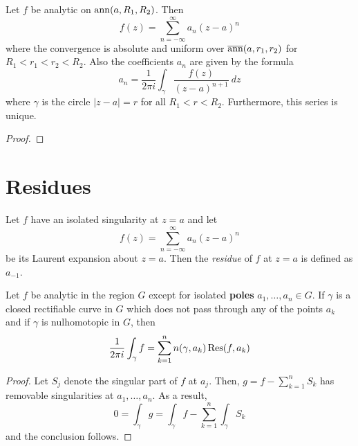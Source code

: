 \begin{theorem}
    Let $f$ be analytic on $\operatorname{ann}(a,R_1,R_2)$. Then 
    \begin{equation*}
        f(z) = \sum_{n = -\infty}^\infty a_n(z - a)^n
    \end{equation*}
    where the convergence is absolute and uniform over $\overline{\operatorname{ann}}(a,r_1,r_2)$ for $R_1 < r_1 < r_2 < R_2$. Also the coefficients $a_n$ are given by the formula 
    \begin{equation*}
        a_n = \frac{1}{2\pi i}\int_\gamma\frac{f(z)}{(z - a)^{n + 1}}~dz
    \end{equation*}
    where $\gamma$ is the circle $|z - a| = r$ for all $R_1 < r < R_2$. Furthermore, this series is unique.
\end{theorem}
\begin{proof}
    
\end{proof}

\section{Residues}

\begin{definition}
    Let $f$ have an isolated singularity at $z = a$ and let 
    \begin{equation*}
        f(z) = \sum_{n = -\infty}^\infty a_n(z - a)^n
    \end{equation*}
    be its Laurent expansion about $z = a$. Then the \textit{residue} of $f$ at $z = a$ is defined as $a_{-1}$.
\end{definition}

\begin{theorem}
    Let $f$ be analytic in the region $G$ except for isolated \textbf{poles} $a_1,\ldots,a_n\in G$. If $\gamma$ is a closed rectifiable curve in $G$ which does not pass through any of the points $a_k$ and if $\gamma$ is nulhomotopic in $G$, then 
    \begin{equation*}
        \frac{1}{2\pi i}\int_\gamma f = \sum_{k = 1}^n n(\gamma,a_k)\operatorname{Res}(f,a_k)
    \end{equation*}
\end{theorem}
\begin{proof}
    Let $S_j$ denote the singular part of $f$ at $a_j$. Then, $g = f - \sum_{k = 1}^n S_k$ has removable singularities at $a_1,\ldots,a_n$. As a result,
    \begin{equation*}
        0 = \int_\gamma g = \int_\gamma f - \sum_{k = 1}^n\int_\gamma S_k 
    \end{equation*}
    and the conclusion follows.
\end{proof}

